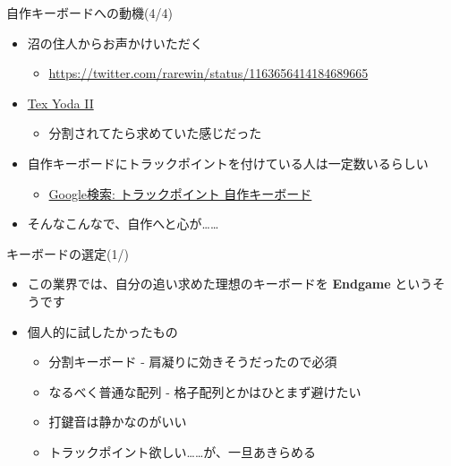 \documentclass[cjk,dvipdfmx,10pt,compress,fragile%
hyperref={bookmarks=true,bookmarksnumbered=true,bookmarksopen=false,%
colorlinks=false,%
pdftitle={第 134 回 関西 Debian 勉強会},%
pdfauthor={小林},%
pdfsubject={資料},%
}]{beamer}
\begin{document}
\begin{frame}[fragile,t]{自作キーボードへの動機(4/4)}
 \begin{itemize}
  \item 沼の住人からお声かけいただく
	\begin{itemize}
	 \item \url{https://twitter.com/rarewin/status/1163656414184689665}
	\end{itemize}
  \item \href{https://mechanicalkeyboards.com/shop/index.php?l=product_detail&p=3532}{Tex Yoda II}
	\begin{itemize}
	 \item 分割されてたら求めていた感じだった
	\end{itemize}
  \item 自作キーボードにトラックポイントを付けている人は一定数いるらしい
	\begin{itemize}
	 \item \href{https://www.google.com/search?client=firefox-b-e&q=%E3%83%88%E3%83%A9%E3%83%83%E3%82%AF%E3%83%9D%E3%82%A4%E3%83%B3%E3%83%88+%E8%87%AA%E4%BD%9C%E3%82%AD%E3%83%BC%E3%83%9C%E3%83%BC%E3%83%89}{Google検索: トラックポイント 自作キーボード}
	\end{itemize}
  \item そんなこんなで、自作へと心が……
 \end{itemize}
\end{frame}

\begin{frame}[fragile,t]{キーボードの選定(1/)}
 \begin{itemize}
  \item この業界では、自分の追い求めた理想のキーボードを \textbf{Endgame} というそうです
  \item 個人的に試したかったもの
	\begin{itemize}
	 \item 分割キーボード - 肩凝りに効きそうだったので必須
	 \item なるべく普通な配列 - 格子配列とかはひとまず避けたい
	 \item 打鍵音は静かなのがいい
	 \item トラックポイント欲しい……が、一旦あきらめる
	\end{itemize}
 \end{itemize}
\end{frame}
\end{document}
